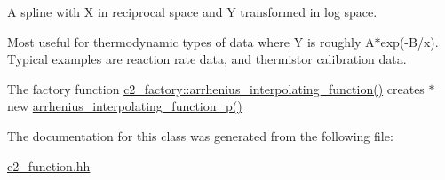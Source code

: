A spline with X in reciprocal space and Y transformed in log space.

Most useful for thermodynamic types of data where Y is roughly A$\ast$exp(-\/\-B/x). Typical examples are reaction rate data, and thermistor calibration data. 

The factory function \hyperlink{classc2__factory_ac2ab3145f84167194ba1ff71aaaa6ffe}{c2\-\_\-factory\-::arrhenius\-\_\-interpolating\-\_\-function()} creates $\ast$new \hyperlink{classarrhenius__interpolating__function__p_ad0557b1774e14d7a310aa14bb64d6bc5}{arrhenius\-\_\-interpolating\-\_\-function\-\_\-p()} 

The documentation for this class was generated from the following file\-:\begin{DoxyCompactItemize}
\item 
\hyperlink{c2__function_8hh}{c2\-\_\-function.\-hh}\end{DoxyCompactItemize}
